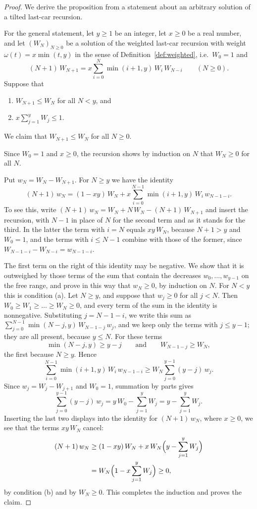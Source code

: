 \documentclass{amsart}
\theoremstyle{definition}
\theoremstyle{remark}
\numberwithin{equation}{section}
\begin{document}
\begin{proof}
We derive the proposition from a statement about an arbitrary solution of a tilted last-car recursion.

For the general statement, let $y\ge 1$ be an integer, let $x\ge 0$ be a real number, and let $(W_N)_{N\ge 0}$ be a solution of the weighted last-car recursion with weight $\omega(t)=x\min(t,y)$ in the sense of Definition~\ref{def:weighted}, i.e.\ $W_0=1$ and
\[
(N+1)\,W_{N+1}=x\sum_{i=0}^{N}\min(i+1,y)\,W_i\,W_{N-i}\qquad(N\ge 0).
\]
Suppose that
\begin{enumerate}
\item[\textup{(a)}] $W_{N+1}\le W_N$ for all $N<y$, and
\item[\textup{(b)}] $x\sum_{j=1}^{y}W_j\le 1$.
\end{enumerate}
We claim that $W_{N+1}\le W_N$ for all $N\ge 0$.

Since $W_0=1$ and $x\ge 0$, the recursion shows by induction on $N$ that $W_N\ge 0$ for all $N$.

Put $w_N=W_N-W_{N+1}$. For $N\ge y$ we have the identity
\[
(N+1)\,w_N=(1-xy)\,W_N+x\sum_{i=0}^{N-1}\min(i+1,y)\,W_i\,w_{N-1-i}.
\]
To see this, write $(N+1)\,w_N=W_N+N\,W_N-(N+1)\,W_{N+1}$ and insert the recursion, with $N-1$ in place of $N$ for the second term and as it stands for the third. In the latter the term with $i=N$ equals $xy\,W_N$, because $N+1>y$ and $W_0=1$, and the terms with $i\le N-1$ combine with those of the former, since $W_{N-1-i}-W_{N-i}=w_{N-1-i}$.

The first term on the right of this identity may be negative. We show that it is outweighed by those terms of the sum that contain the decreases $w_0,\dots,w_{y-1}$ on the free range, and prove in this way that $w_N\ge 0$, by induction on $N$. For $N<y$ this is condition (a). Let $N\ge y$, and suppose that $w_j\ge 0$ for all $j<N$. Then $W_0\ge W_1\ge\dots\ge W_N\ge 0$, and every term of the sum in the identity is nonnegative. Substituting $j=N-1-i$, we write this sum as $\sum_{j=0}^{N-1}\min(N-j,y)\,W_{N-1-j}\,w_j$, and we keep only the terms with $j\le y-1$; they are all present, because $y\le N$. For these terms
\[
\min(N-j,y)\ge y-j\qquad\text{and}\qquad W_{N-1-j}\ge W_N,
\]
the first because $N\ge y$. Hence
\[
\sum_{i=0}^{N-1}\min(i+1,y)\,W_i\,w_{N-1-i}\ge W_N\sum_{j=0}^{y-1}(y-j)\,w_j.
\]
Since $w_j=W_j-W_{j+1}$ and $W_0=1$, summation by parts gives
\[
\sum_{j=0}^{y-1}(y-j)\,w_j=y\,W_0-\sum_{j=1}^{y}W_j=y-\sum_{j=1}^{y}W_j.
\]
Inserting the last two displays into the identity for $(N+1)\,w_N$, where $x\ge 0$, we see that the terms $xy\,W_N$ cancel:
\begin{align*}
(N+1)\,w_N&\ge(1-xy)\,W_N+x\,W_N\Bigl(y-\sum_{j=1}^{y}W_j\Bigr)\\
&=W_N\Bigl(1-x\sum_{j=1}^{y}W_j\Bigr)\ge 0,
\end{align*}
by condition (b) and by $W_N\ge 0$. This completes the induction and proves the claim.


\end{proof}
\end{document}
